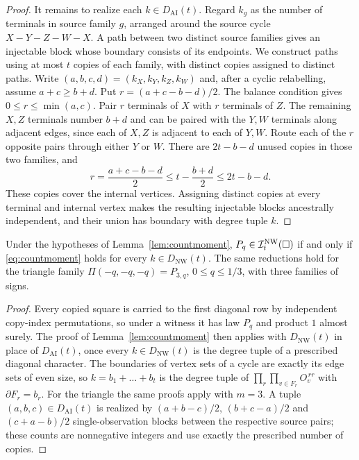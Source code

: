 \begin{proof}
It remains to realize each $k\in D_{\mathrm{AI}}(t)$. Regard $k_g$ as the number of terminals in source family $g$, arranged around the source cycle $X-Y-Z-W-X$. A path between two distinct source families gives an injectable block whose boundary consists of its endpoints. We construct paths using at most $t$ copies of each family, with distinct copies assigned to distinct paths. Write $(a,b,c,d)=(k_X,k_Y,k_Z,k_W)$ and, after a cyclic relabelling, assume $a+c\ge b+d$. Put $r=(a+c-b-d)/2$. The balance condition gives $0\le r\le\min(a,c)$. Pair $r$ terminals of $X$ with $r$ terminals of $Z$. The remaining $X,Z$ terminals number $b+d$ and can be paired with the $Y,W$ terminals along adjacent edges, since each of $X,Z$ is adjacent to each of $Y,W$. Route each of the $r$ opposite pairs through either $Y$ or $W$. There are $2t-b-d$ unused copies in those two families, and
\[
r=\frac{a+c-b-d}{2}\le t-\frac{b+d}{2}\le2t-b-d.
\]
These copies cover the internal vertices. Assigning distinct copies at every terminal and internal vertex makes the resulting injectable blocks ancestrally independent, and their union has boundary with degree tuple $k$.
\end{proof}

\begin{lemma}\label{lem:countmomentNW}
Under the hypotheses of Lemma~\ref{lem:countmoment}, $P_q\in\mathcal I^{\mathrm{NW}}_t(\square)$ if and only if \eqref{eq:countmoment} holds for every $k\in D_{\mathrm{NW}}(t)$. The same reductions hold for the triangle family $\Pi(-q,-q,-q)=P_{3,q}$, $0\le q\le1/3$, with three families of signs.
\end{lemma}

\begin{proof}
Every copied square is carried to the first diagonal row by independent copy-index permutations, so under a witness it has law $P_q$ and product $1$ almost surely. The proof of Lemma~\ref{lem:countmoment} then applies with $D_{\mathrm{NW}}(t)$ in place of $D_{\mathrm{AI}}(t)$, once every $k\in D_{\mathrm{NW}}(t)$ is the degree tuple of a prescribed diagonal character. The boundaries of vertex sets of a cycle are exactly its edge sets of even size, so $k=b_1+\dots+b_t$ is the degree tuple of $\prod_r\prod_{v\in F_r}O_v^{\,rr}$ with $\partial F_r=b_r$. For the triangle the same proofs apply with $m=3$. A tuple $(a,b,c)\in D_{\mathrm{AI}}(t)$ is realized by $(a+b-c)/2$, $(b+c-a)/2$ and $(c+a-b)/2$ single-observation blocks between the respective source pairs; these counts are nonnegative integers and use exactly the prescribed number of copies.
\end{proof}

